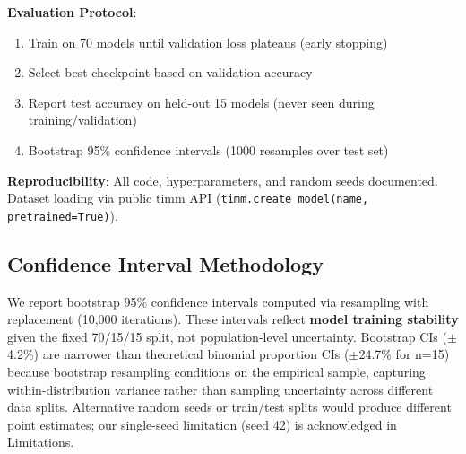 \textbf{Evaluation Protocol}:
\begin{enumerate}
\item Train on 70 models until validation loss plateaus (early stopping)
\item Select best checkpoint based on validation accuracy
\item Report test accuracy on held-out 15 models (never seen during training/validation)
\item Bootstrap 95\% confidence intervals (1000 resamples over test set)
\end{enumerate}

\textbf{Reproducibility}: All code, hyperparameters, and random seeds documented. Dataset loading via public timm API (\texttt{timm.create\_model(name, pretrained=True)}).

\subsection{Confidence Interval Methodology}

We report bootstrap 95\% confidence intervals computed via resampling with replacement (10,000 iterations). These intervals reflect \textbf{model training stability} given the fixed 70/15/15 split, not population-level uncertainty. Bootstrap CIs ($\pm$4.2\%) are narrower than theoretical binomial proportion CIs ($\pm$24.7\% for n=15) because bootstrap resampling conditions on the empirical sample, capturing within-distribution variance rather than sampling uncertainty across different data splits. Alternative random seeds or train/test splits would produce different point estimates; our single-seed limitation (seed 42) is acknowledged in Limitations.
